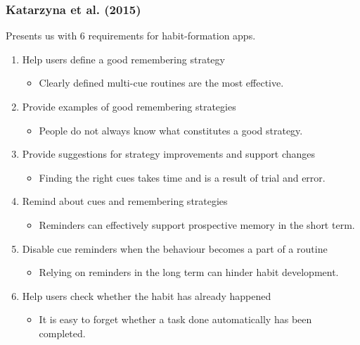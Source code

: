 \subsubsection*{Katarzyna et al. (2015)}

  Presents us with 6 requirements for habit-formation apps.

  \begin{enumerate}

    \item Help users define a good remembering strategy
      \begin{itemize}
        \item Clearly defined multi-cue routines are the most effective.
      \end{itemize}

    \item Provide examples of good remembering strategies
      \begin{itemize}
        \item People do not always know what constitutes a good strategy.
      \end{itemize}

    \item Provide suggestions for strategy improvements and support changes
      \begin{itemize}
        \item Finding the right cues takes time and is a result of trial and error.
      \end{itemize}

    \item Remind about cues and remembering strategies
      \begin{itemize}
        \item Reminders can effectively support prospective memory in the short term.
      \end{itemize}

    \item Disable cue reminders when the behaviour becomes a part of a routine
      \begin{itemize}
        \item Relying on reminders in the long term can hinder habit development.
      \end{itemize}

    \item Help users check whether the habit has already happened
      \begin{itemize}
        \item It is easy to forget whether a task done automatically has been completed.
    \end{itemize}

  \end{enumerate}

